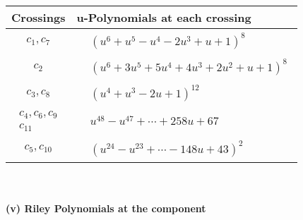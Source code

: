 \documentclass[1p]{elsarticle_modified}
\theoremstyle{definition}
\begin{document}
\begin{tabular}{m{50pt}|m{274pt}}
Crossings & \hspace{64pt}u-Polynomials at each crossing \\
\hline $$\begin{aligned}c_{1},c_{7}\end{aligned}$$&$\begin{aligned}
&(u^6+u^5- u^4-2 u^3+u+1)^8
\end{aligned}$\\
\hline $$\begin{aligned}c_{2}\end{aligned}$$&$\begin{aligned}
&(u^6+3 u^5+5 u^4+4 u^3+2 u^2+u+1)^8
\end{aligned}$\\
\hline $$\begin{aligned}c_{3},c_{8}\end{aligned}$$&$\begin{aligned}
&(u^4+u^3-2 u+1)^{12}
\end{aligned}$\\
\hline $$\begin{aligned}c_{4},c_{6},c_{9}\\c_{11}\end{aligned}$$&$\begin{aligned}
&u^{48}- u^{47}+\cdots+258 u+67
\end{aligned}$\\
\hline $$\begin{aligned}c_{5},c_{10}\end{aligned}$$&$\begin{aligned}
&(u^{24}- u^{23}+\cdots-148 u+43)^{2}
\end{aligned}$\\
\hline
\end{tabular}\\~\\
\newpage\renewcommand{\arraystretch}{1}
\flushleft \textbf{(v) Riley Polynomials at the component}\newline \\
\end{document}
